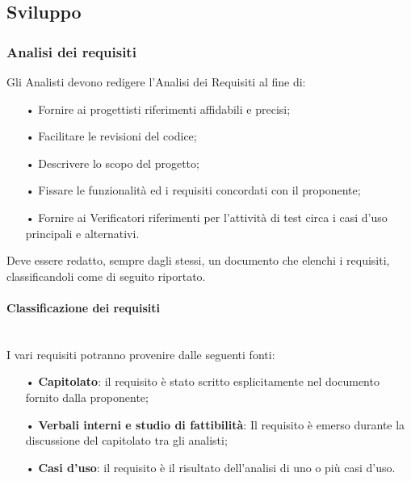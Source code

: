 \subsection{Sviluppo}
\subsubsection{Analisi dei requisiti}
Gli Analisti devono redigere l'Analisi dei Requisiti al fine di:
\begin{itemize}
    \item[•] Fornire ai progettisti riferimenti affidabili e precisi;
    \item[•] Facilitare le revisioni del codice;
    \item[•] Descrivere lo scopo del progetto;
    \item[•] Fissare le funzionalità ed i requisiti concordati con il proponente;
    \item[•] Fornire ai Verificatori riferimenti per l'attività di test circa i casi d'uso principali e alternativi.
\end{itemize}

Deve essere redatto, sempre dagli stessi, un documento che elenchi i requisiti, classificandoli come di seguito riportato.

\paragraph{Classificazione dei requisiti}\mbox{}\\
I vari {requisiti} potranno provenire dalle seguenti fonti:
\begin{itemize}
    \item[•] \textbf{Capitolato}: il requisito è stato scritto esplicitamente nel documento fornito dalla proponente;
    \item[•] \textbf{Verbali interni e studio di fattibilità}: Il requisito è emerso durante la discussione del capitolato tra gli analisti;
    \item[•] \textbf{Casi d'uso}: il requisito è il risultato dell'analisi di uno o più casi d'uso.
\end{itemize}

